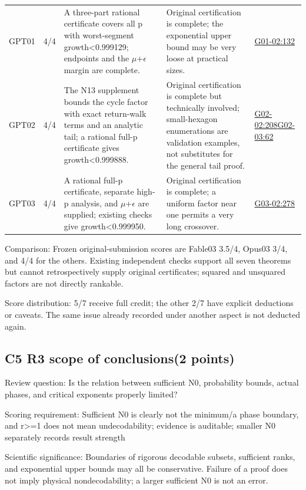 \documentclass[11pt,a4paper]{article}
\begin{document}
{\begin{longtable}
{}GPT01 & 4/\allowbreak{}4 & A three-part rational certificate covers all p with worst-segment growth<0.999129; endpoints and the \ensuremath{\mu}+\ensuremath{\epsilon} margin are complete. & Original certification is complete; the exponential upper bound may be very loose at practical sizes. & \hyperref[src:G01-02]{G01-02:132}\tabularnewline
{}GPT02 & 4/\allowbreak{}4 & The N13 supplement bounds the cycle factor with exact return-walk terms and an analytic tail; a rational full-p certificate gives growth<0.999888. & Original certification is complete but technically involved; small-hexagon enumerations are validation examples,\allowbreak{} not substitutes for the general tail proof. & \hyperref[src:G02-02]{G02-02:208}\newline \hyperref[src:G02-03]{G02-03:62}\tabularnewline
{}GPT03 & 4/\allowbreak{}4 & A rational full-p certificate,\allowbreak{} separate high-p analysis,\allowbreak{} and \ensuremath{\mu}+\ensuremath{\epsilon} are supplied; existing checks give growth<0.999950. & Original certification is complete; a uniform factor near one permits a very long crossover. & \hyperref[src:G03-02]{G03-02:278}\tabularnewline
\bottomrule
\end{longtable}
}
Comparison: Frozen original-submission scores are Fable03 3.5/\allowbreak{}4,\allowbreak{} Opus03 3/\allowbreak{}4,\allowbreak{} and 4/\allowbreak{}4 for the others. Existing independent checks support all seven theorems but cannot retrospectively supply original certificates; squared and unsquared factors are not directly rankable.

Score distribution: 5/\allowbreak{}7 receive full credit; the other 2/\allowbreak{}7 have explicit deductions or caveats. The same issue already recorded under another aspect is not deducted again.

\clearpage
\subsection{C5 R3 scope of conclusions(2 points)}
\label{aspect:C5}
Review question: Is the relation between sufficient N0,\allowbreak{} probability bounds,\allowbreak{} actual phases,\allowbreak{} and critical exponents properly limited?

Scoring requirement: Sufficient N0 is clearly not the minimum/\allowbreak{}a phase boundary,\allowbreak{} and r>=1 does not mean undecodability; evidence is auditable; smaller N0 separately records result strength

Scientific significance: Boundaries of rigorous decodable subsets,\allowbreak{} sufficient ranks,\allowbreak{} and exponential upper bounds may all be conservative. Failure of a proof does not imply physical nondecodability; a larger sufficient N0 is not an error.
\end{document}
